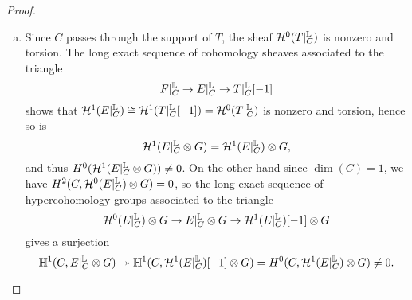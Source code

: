 \begin{proof}
\begin{enumerate}[(a)]
    We first analyze the restriction $Q|^\LL_C$. To begin with, we have an exact triangle
    \[ Q \xrightarrow{f} Q \to Q|^\LL_{D_1} \]
    where the map induced by $f$ is an injective map of sheaves, showing that $Q|^\LL_{D_1} = Q|_{D_1}$ is a 0-dimensional sheaf. From the triangle
    \[ Q|_{D_1} \xrightarrow{g} Q|_{D_1} \to Q|^\LL_C \]
    we get an exact sequence
    \[ 0 \to \sH^{-1}(Q|^\LL_C) \to Q|_{D_1} \xrightarrow{g} Q|_{D_1} \to \sH^0(Q|^\LL_C) \to 0 \]
    which shows that $\sH^{-1}(Q|^\LL_C)$ and $\sH^0(Q|^\LL_C)$ are torsion sheaves on $C$.
    
    Next, as $F^\dd$ is reflexive, the restriction $F^\dd|^\LL_{D_1} = F^\dd|_{D_1}$ is torsion-free by \cite[Corollary 1.1.14]{HL}, and so the restriction $F^\dd|^\LL_C = F^\dd|_C$ is a sheaf on $C$. From the short exact sequence
    \[ 0 \to F \to F^\dd \to Q \to 0 \]
    we get a triangle $F|^\LL_C \to F^\dd|_C \to Q|^\LL_C$, yielding an exact sequence of sheaves
    \[ 0 \to \sH^{-1}(Q|^\LL_C) \to F|_C \to F^\dd|_C \to \sH^0(Q|^\LL_C) \to 0, \]
    which shows that the restriction $F|^\LL_C = F|_C$ is a sheaf. For the proof of part (c) we also note that $F|^\LL_C = F|_C$ contains $\sH^{-1}(Q|^\LL_C)$ as a torsion subsheaf.
    
    Similarly, we have triangles
    \[ T \xrightarrow{f} T \to T|^\LL_{D_1} \qquad \text{and} \qquad  T|^\LL_{D_1} \xrightarrow{g} T|^\LL_{D_1} \to T|^\LL_C. \]
    Combining the associated long exact sequences of cohomology sheaves implies that $\sH^i(T|^\LL_C)$ is 0-dimensional for $i = -2, -1, 0$ and vanishes otherwise.
    
    \item Since $C$ passes through the support of $T$, the sheaf $\mathcal{H}^0(T|^{\mathbb{L}}_C)$ is nonzero and torsion. The long exact sequence of cohomology sheaves associated to the triangle
    \[ F|^{\mathbb{L}}_C \to E|^{\mathbb{L}}_C \to T|^{\mathbb{L}}_C[-1] \]
    shows that $\mathcal{H}^1(E|^{\mathbb{L}}_C) \cong \mathcal{H}^1(T|^{\mathbb{L}}_C[-1]) = \mathcal{H}^0(T|^{\mathbb{L}}_C)$ is nonzero and torsion, hence so is 
    \[ \mathcal{H}^1(E|^{\mathbb{L}}_C \otimes G) = \mathcal{H}^1(E|^{\mathbb{L}}_C) \otimes G, \]
    and thus $H^0(\mathcal{H}^1(E|^{\mathbb{L}}_C \otimes G)) \neq 0$. On the other hand since $\dim(C) = 1$, we have $H^2(C, \mathcal{H}^0(E|^{\mathbb{L}}_C) \otimes G) = 0$, so the long exact sequence of hypercohomology groups associated to the triangle 
    \[ \mathcal{H}^0(E|^{\mathbb{L}}_C) \otimes G \to E|^{\mathbb{L}}_C \otimes G \to \mathcal{H}^1(E|^{\mathbb{L}}_C)[-1] \otimes G \]
    gives a surjection
    \[ \mathbb{H}^1(C, E|^{\mathbb{L}}_C \otimes G) \twoheadrightarrow \mathbb{H}^1(C, \mathcal{H}^1(E|^{\mathbb{L}}_C)[-1] \otimes G) = H^0(C, \mathcal{H}^1(E|^{\mathbb{L}}_C) \otimes G) \neq 0. \]
    

\end{enumerate}
\end{proof}
